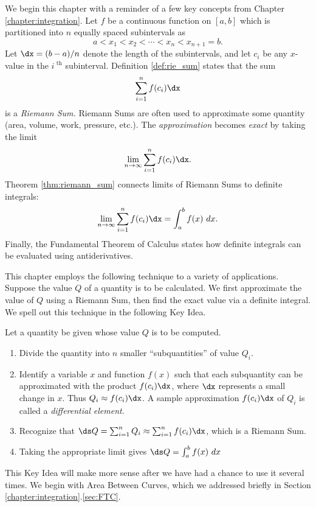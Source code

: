 We begin this chapter with a reminder of a few key concepts from Chapter \ref{chapter:integration}. Let $f$ be a continuous function on $[a,b]$ which is partitioned into $n$ equally spaced subintervals as 
$$a<x_1 < x_2 < \cdots < x_n<x_{n+1}=b.$$ Let $\dx=(b-a)/n$ denote the length of the  subintervals, and let $c_i$ be any $x$-value in the $i^\text{ th}$ subinterval. Definition \ref{def:rie_sum} states that the sum $$\sum_{i=1}^n f(c_i)\dx$$ is a \textit{Riemann Sum.} Riemann Sums are often used to approximate some quantity (area, volume, work, pressure, etc.). The \textit{approximation} becomes \textit{exact} by taking the limit 
$$\lim_{n\to\infty} \sum_{i=1}^n f(c_i)\dx.$$ Theorem \ref{thm:riemann_sum} connects limits of Riemann Sums to definite integrals:
$$\lim_{n\to\infty} \sum_{i=1}^n f(c_i)\dx = \int_a^b f(x)\ dx.$$ Finally, the Fundamental Theorem of Calculus states how definite integrals can be evaluated using antiderivatives. 

This chapter employs the following technique to a variety of applications. Suppose the value $Q$ of a quantity is to be calculated. We first approximate the value of $Q$ using a Riemann Sum, then find the exact value via a definite integral. We spell out this technique in the following Key Idea.
\enlargethispage{20\baselineskip}

{Let a quantity be given whose value $Q$ is to be computed.
\begin{enumerate}
\item		Divide the quantity into $n$ smaller ``subquantities'' of value $Q_i$.
\item		Identify a variable $x$ and function $f(x)$ such that each subquantity can be approximated with the product $f(c_i)\dx$, where $\dx$ represents a small change in $x$. Thus $Q_i \approx f(c_i)\dx$. A sample approximation $f(c_i)\dx$ of $Q_i$ is called a \textit{differential element}.
\item		Recognize that $\ds Q= \sum_{i=1}^n Q_i \approx \sum_{i=1}^n f(c_i)\dx$, which is a Riemann Sum.
\item		Taking the appropriate limit gives $\ds Q = \int_a^b f(x)\ dx$
\end{enumerate}
}
\restoreboxwidth

This Key Idea will make more sense after we have had a chance to use it several times. We begin with Area Between Curves, which we addressed briefly in Section \ref{chapter:integration}.\ref{sec:FTC}.
\clearpage

